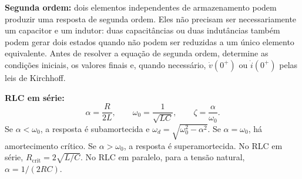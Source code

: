 \begin{conceito}
\textbf{Segunda ordem:} dois elementos independentes de armazenamento podem
produzir uma resposta de segunda ordem. Eles não precisam ser necessariamente um
capacitor e um indutor: duas capacitâncias ou duas indutâncias também podem gerar
dois estados quando não podem ser reduzidas a um único elemento equivalente.
Antes de resolver a equação de segunda ordem, determine as condições iniciais,
os valores finais e, quando necessário, $\dot v(0^+)$ ou $\dot i(0^+)$ pelas leis
de Kirchhoff.

\textbf{RLC em série:}
\[
\alpha=\frac{R}{2L},\qquad
\omega_0=\frac{1}{\sqrt{LC}},\qquad
\zeta=\frac{\alpha}{\omega_0}.
\]
Se $\alpha<\omega_0$, a resposta é subamortecida e
$\omega_d=\sqrt{\omega_0^2-\alpha^2}$. Se $\alpha=\omega_0$, há amortecimento
crítico. Se $\alpha>\omega_0$, a resposta é superamortecida. No RLC em série,
$R_{\mathrm{crit}}=2\sqrt{L/C}$. No RLC em paralelo, para a tensão natural,
$\alpha=1/(2RC)$.
\end{conceito}

\legendaniveis












